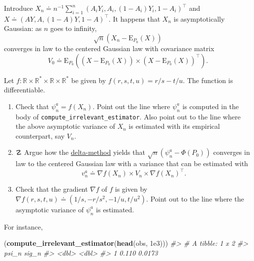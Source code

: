 \documentclass[11pt,openright,twoside]{book}
\newenvironment{Shaded}{\begin{snugshade}}{\end{snugshade}}
\newcommand{\CommentTok}[1]{\textcolor[rgb]{0.56,0.35,0.01}{\textit{#1}}}
\newcommand{\FloatTok}[1]{\textcolor[rgb]{0.00,0.00,0.81}{#1}}
\newcommand{\KeywordTok}[1]{\textcolor[rgb]{0.13,0.29,0.53}{\textbf{#1}}}
\newcommand{\NormalTok}[1]{#1}
\DeclareRobustCommand{\stixdanger}{%
  {\usefont{U}{stixbbit}{m}{it}\symbol{"F6}}%
}
\newcommand{\bbR}{\mathbb{R}}
\newcommand{\defq}{\doteq}
\newcommand{\Exp}{\textrm{E}}
\theoremstyle{definition}
\theoremstyle{definition}
\theoremstyle{definition}
\theoremstyle{remark}
\begin{document}
Introduce \(X_{n} \defq n^{-1}\sum_{i=1}^{n} \left(A_{i}Y_{i}, A_{i}, (1-A_{i})Y_{i}, 1-A_{i}\right)^{\top}\) and \(X \defq \left(AY, A, (1-A)Y, 1-A\right)^{\top}\). It happens that \(X_{n}\) is asymptotically Gaussian: as
\(n\) goes to infinity,\begin{equation*}\sqrt{n} \left(X_{n}  -  \Exp_{P_{0}}
(X)\right)\end{equation*} converges in law to the centered Gaussian law with
covariance matrix \begin{equation*}V_{0} \defq \Exp_{P_{0}} \left((X
- \Exp_{P_{0}} (X)) \times (X- \Exp_{P_{0}} (X))^{\top}\right).\end{equation*}

Let \(f:\bbR\times \bbR^{*} \times \bbR\times \bbR^{*}\) be given by \(f(r,s,t,u) = r/s - t/u\). The function is differentiable.

\begin{enumerate}
\def\labelenumi{\arabic{enumi}.}
\item
  Check that \(\psi_{n}^{a} = f(X_{n})\). Point out the line where
  \(\psi_{n}^{a}\) is computed in the body of \texttt{compute\_irrelevant\_estimator}.
  Also point out to the line where the above asymptotic variance of \(X_{n}\)
  is estimated with its empirical counterpart, say \(V_{n}\).
\item
  ☡ \stixdanger{} Argue how the \protect\hyperlink{prop-delta-method}{delta-method}
  yields that \(\sqrt{n}(\psi_{n}^{a} - \Phi(P_{0}))\) converges in law to the
  centered Gaussian law with a variance that can be estimated with
  \begin{equation}  v_{n}^{a}  \defq  \nabla f(X_{n})  \times  V_{n}  \times
  \nabla f(X_{n})^{\top}. \label{eq:v-n-a} \end{equation}
\item
  Check that the gradient \(\nabla f\) of \(f\) is given by \(\nabla f(r,s,t,u) \defq (1/s, -r/s^{2}, -1/u, t/u^{2})\). Point out to the line where the
  asymptotic variance of \(\psi_{n}^{a}\) is estimated.
\end{enumerate}

For instance,

\begin{Shaded}
\begin{Highlighting}[]
\NormalTok{(}\KeywordTok{compute_irrelevant_estimator}\NormalTok{(}\KeywordTok{head}\NormalTok{(obs, }\FloatTok{1e3}\NormalTok{)))}
\CommentTok{#> # A tibble: 1 x 2}
\CommentTok{#>   psi_n  sig_n}
\CommentTok{#>   <dbl>  <dbl>}
\CommentTok{#> 1 0.110 0.0173}
\end{Highlighting}
\end{Shaded}
\end{document}

